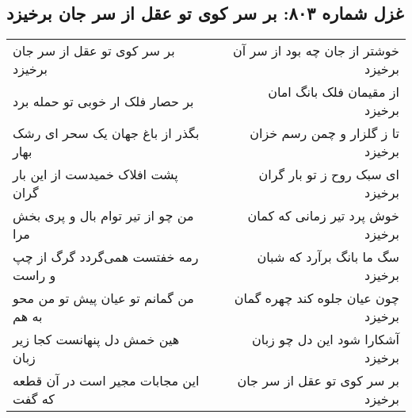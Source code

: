 \begin{center}
\section*{غزل شماره ۸۰۳: بر سر کوی تو عقل از سر جان برخیزد}
\label{sec:0803}
\begin{longtable}{l p{0.5cm} r}
بر سر کوی تو عقل از سر جان برخیزد
&&
خوشتر از جان چه بود از سر آن برخیزد
\\
بر حصار فلک ار خوبی تو حمله برد
&&
از مقیمان فلک بانگ امان برخیزد
\\
بگذر از باغ جهان یک سحر ای رشک بهار
&&
تا ز گلزار و چمن رسم خزان برخیزد
\\
پشت افلاک خمیدست از این بار گران
&&
ای سبک روح ز تو بار گران برخیزد
\\
من چو از تیر توام بال و پری بخش مرا
&&
خوش پرد تیر زمانی که کمان برخیزد
\\
رمه خفتست همی‌گردد گرگ از چپ و راست
&&
سگ ما بانگ برآرد که شبان برخیزد
\\
من گمانم تو عیان پیش تو من محو به هم
&&
چون عیان جلوه کند چهره گمان برخیزد
\\
هین خمش دل پنهانست کجا زیر زبان
&&
آشکارا شود این دل چو زبان برخیزد
\\
این مجابات مجیر است در آن قطعه که گفت
&&
بر سر کوی تو عقل از سر جان برخیزد
\\
\end{longtable}
\end{center}
